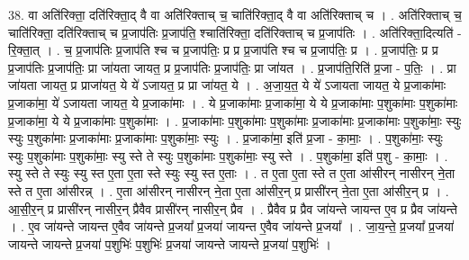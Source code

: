 \documentclass[17pt]{extarticle}
\begin{document}
38. वा अति॑रिक्ता॒ दति॑रिक्ता॒द् वै वा अति॑रिक्ताच् च॒ चाति॑रिक्ता॒द् वै वा अति॑रिक्ताच् च । . अति॑रिक्ताच् च॒ चाति॑रिक्ता॒ दति॑रिक्ताच् च प्र॒जाप॑तिः प्र॒जाप॑ति॒ श्चाति॑रिक्ता॒ दति॑रिक्ताच् च प्र॒जाप॑तिः । . अति॑रिक्ता॒दित्यति॑ - रि॒क्ता॒त् । . च॒ प्र॒जाप॑तिः प्र॒जाप॑ति श्च च प्र॒जाप॑तिः॒ प्र प्र प्र॒जाप॑ति श्च च प्र॒जाप॑तिः॒ प्र । . प्र॒जाप॑तिः॒ प्र प्र प्र॒जाप॑तिः प्र॒जाप॑तिः॒ प्रा जा॑यता जायत॒ प्र प्र॒जाप॑तिः प्र॒जाप॑तिः॒ प्रा जा॑यत । . प्र॒जाप॑ति॒रिति॑ प्र॒जा - प॒तिः॒ । . प्रा जा॑यता जायत॒ प्र प्राजा॑यत॒ ये ये॑ ऽजायत॒ प्र प्रा जा॑यत॒ ये । . अ॒जा॒य॒त॒ ये ये॑ ऽजायता जायत॒ ये प्र॒जाका॑माः प्र॒जाका॑मा॒ ये॑ ऽजायता जायत॒ ये प्र॒जाका॑माः । . ये प्र॒जाका॑माः प्र॒जाका॑मा॒ ये ये प्र॒जाका॑माः प॒शुका॑माः प॒शुका॑माः प्र॒जाका॑मा॒ ये ये प्र॒जाका॑माः प॒शुका॑माः । . प्र॒जाका॑माः प॒शुका॑माः प॒शुका॑माः प्र॒जाका॑माः प्र॒जाका॑माः प॒शुका॑माः॒ स्युः स्युः प॒शुका॑माः प्र॒जाका॑माः प्र॒जाका॑माः प॒शुका॑माः॒ स्युः । . प्र॒जाका॑मा॒ इति॑ प्र॒जा - का॒माः॒ । . प॒शुका॑माः॒ स्युः स्युः प॒शुका॑माः प॒शुका॑माः॒ स्यु स्ते ते स्युः प॒शुका॑माः प॒शुका॑माः॒ स्यु स्ते । . प॒शुका॑मा॒ इति॑ प॒शु - का॒माः॒ । . स्यु स्ते ते स्युः स्यु स्त ए॒ता ए॒ता स्ते स्युः स्यु स्त ए॒ताः । . त ए॒ता ए॒ता स्ते त ए॒ता आ॑सीरन् नासीरन् ने॒ता स्ते त ए॒ता आ॑सीरन्न् । . ए॒ता आ॑सीरन् नासीरन् ने॒ता ए॒ता आ॑सीर॒न् प्र प्रासी॑रन् ने॒ता ए॒ता आ॑सीर॒न् प्र । . आ॒सी॒र॒न् प्र प्रासी॑रन् नासीर॒न् प्रैवैव प्रासी॑रन् नासीर॒न् प्रैव । . प्रैवैव प्र प्रैव जा॑यन्ते जायन्त ए॒व प्र प्रैव जा॑यन्ते । . ए॒व जा॑यन्ते जायन्त ए॒वैव जा॑यन्ते प्र॒जया᳚ प्र॒जया॑ जायन्त ए॒वैव जा॑यन्ते प्र॒जया᳚ । . जा॒य॒न्ते॒ प्र॒जया᳚ प्र॒जया॑ जायन्ते जायन्ते प्र॒जया॑ प॒शुभिः॑ प॒शुभिः॑ प्र॒जया॑ जायन्ते जायन्ते प्र॒जया॑ प॒शुभिः॑ । \newline
\end{document}
